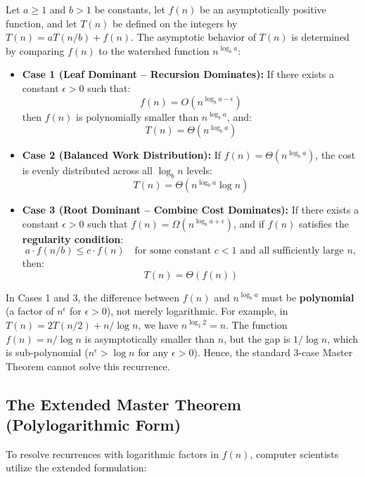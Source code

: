 \documentclass[11pt,a4paper]{article}
\begin{document}
\begin{theorembox}
Let $a \ge 1$ and $b > 1$ be constants, let $f(n)$ be an asymptotically positive function, and let $T(n)$ be defined on the integers by $T(n) = a T(n/b) + f(n)$. The asymptotic behavior of $T(n)$ is determined by comparing $f(n)$ to the watershed function $n^{\log_b a}$:

\begin{itemize}[leftmargin=1.5em, itemsep=4pt]
    \item \textbf{Case 1 (Leaf Dominant -- Recursion Dominates):}
    If there exists a constant $\epsilon > 0$ such that:
    \[
    f(n) = O\left(n^{\log_b a - \epsilon}\right)
    \]
    then $f(n)$ is polynomially smaller than $n^{\log_b a}$, and:
    \[
    T(n) = \Theta\left(n^{\log_b a}\right)
    \]

    \item \textbf{Case 2 (Balanced Work Distribution):}
    If $f(n) = \Theta\left(n^{\log_b a}\right)$, the cost is evenly distributed across all $\log_b n$ levels:
    \[
    T(n) = \Theta\left(n^{\log_b a} \log n\right)
    \]

    \item \textbf{Case 3 (Root Dominant -- Combine Cost Dominates):}
    If there exists a constant $\epsilon > 0$ such that $f(n) = \Omega\left(n^{\log_b a + \epsilon}\right)$, and if $f(n)$ satisfies the \textbf{regularity condition}:
    \[
    a \cdot f(n/b) \le c \cdot f(n) \quad \text{for some constant } c < 1 \text{ and all sufficiently large } n,
    \]
    then:
    \[
    T(n) = \Theta(f(n))
    \]
\end{itemize}
\end{theorembox}

\begin{notebox}
In Cases 1 and 3, the difference between $f(n)$ and $n^{\log_b a}$ must be \textbf{polynomial} (a factor of $n^\epsilon$ for $\epsilon > 0$), not merely logarithmic. For example, in $T(n) = 2T(n/2) + n / \log n$, we have $n^{\log_2 2} = n$. The function $f(n) = n / \log n$ is asymptotically smaller than $n$, but the gap is $1/\log n$, which is sub-polynomial ($n^\epsilon > \log n$ for any $\epsilon > 0$). Hence, the standard 3-case Master Theorem cannot solve this recurrence.
\end{notebox}

\subsection{The Extended Master Theorem (Polylogarithmic Form)}
To resolve recurrences with logarithmic factors in $f(n)$, computer scientists utilize the extended formulation:
\end{document}
